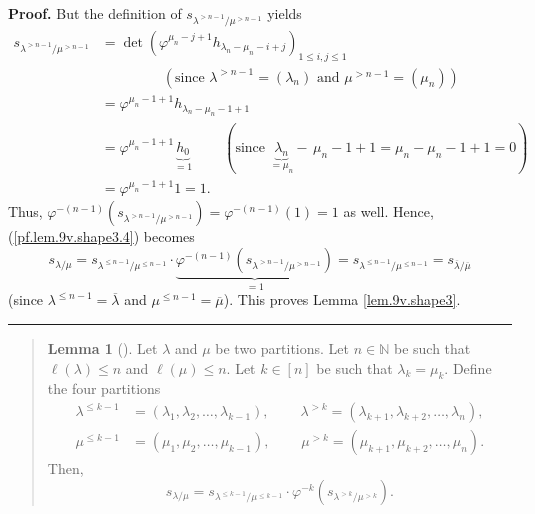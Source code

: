 \documentclass[numbers=enddot,12pt,final,onecolumn,notitlepage]{scrartcl}%
\newenvironment{statement}{\begin{quote}}{\end{quote}}
\theoremstyle{definition}
\newtheorem{lem}[theo]{Lemma}
\newenvironment{lemmain}[1][]
{\begin{statement}\begin{lem}[#1]}
{\end{lem}\end{statement}}
\newenvironment{proof}[1][Proof]{\noindent\textbf{#1.} }{\ \rule{0.5em}{0.5em}}
\newenvironment{lemmain}[1][Proof]{\noindent\textbf{#1.} }{\ \rule{0.5em}{0.5em}}
\begin{document}
\begin{enumerate}
\begin{proof}
But the definition of $s_{\lambda^{>n-1}/\mu^{>n-1}}$ yields%
\begin{align*}
s_{\lambda^{>n-1}/\mu^{>n-1}} &  =\det\left(  \varphi^{\mu_{n}-j+1}%
h_{\lambda_{n}-\mu_{n}-i+j}\right)  _{1\leq i,j\leq1}\\
&  \ \ \ \ \ \ \ \ \ \ \ \ \ \ \ \ \ \ \ \ \left(  \text{since }\lambda
^{>n-1}=\left(  \lambda_{n}\right)  \text{ and }\mu^{>n-1}=\left(  \mu
_{n}\right)  \right)  \\
&  =\varphi^{\mu_{n}-1+1}h_{\lambda_{n}-\mu_{n}-1+1}\\
&  =\varphi^{\mu_{n}-1+1}\underbrace{h_{0}}_{=1}\ \ \ \ \ \ \ \ \ \ \left(
\text{since }\underbrace{\lambda_{n}}_{=\mu_{n}}-\,\mu_{n}-1+1=\mu_{n}-\mu
_{n}-1+1=0\right)  \\
&  =\varphi^{\mu_{n}-1+1}1=1.
\end{align*}
Thus, $\varphi^{-\left(  n-1\right)  }\left(  s_{\lambda^{>n-1}/\mu^{>n-1}%
}\right)  =\varphi^{-\left(  n-1\right)  }\left(  1\right)  =1$ as well.
Hence, (\ref{pf.lem.9v.shape3.4}) becomes%
\[
s_{\lambda/\mu}=s_{\lambda^{\leq n-1}/\mu^{\leq n-1}}\cdot\underbrace{\varphi
^{-\left(  n-1\right)  }\left(  s_{\lambda^{>n-1}/\mu^{>n-1}}\right)  }%
_{=1}=s_{\lambda^{\leq n-1}/\mu^{\leq n-1}}=s_{\overline{\lambda}%
/\overline{\mu}}%
\]
(since $\lambda^{\leq n-1}=\overline{\lambda}$ and $\mu^{\leq n-1}%
=\overline{\mu}$). This proves Lemma \ref{lem.9v.shape3}.
\end{proof}

\begin{lemmain}
\label{lem.9v.shape4}Let $\lambda$ and $\mu$ be two partitions. Let
$n\in\mathbb{N}$ be such that $\ell\left(  \lambda\right)  \leq n$ and
$\ell\left(  \mu\right)  \leq n$. Let $k\in\left[  n\right]  $ be such that
$\lambda_{k}=\mu_{k}$. Define the four partitions%
\begin{align*}
\lambda^{\leq k-1}  &  =\left(  \lambda_{1},\lambda_{2},\ldots,\lambda
_{k-1}\right)  ,\ \ \ \ \ \ \ \ \ \ \lambda^{>k}=\left(  \lambda_{k+1}%
,\lambda_{k+2},\ldots,\lambda_{n}\right)  ,\\
\mu^{\leq k-1}  &  =\left(  \mu_{1},\mu_{2},\ldots,\mu_{k-1}\right)
,\ \ \ \ \ \ \ \ \ \ \mu^{>k}=\left(  \mu_{k+1},\mu_{k+2},\ldots,\mu
_{n}\right)  .
\end{align*}
Then,%
\[
s_{\lambda/\mu}=s_{\lambda^{\leq k-1}/\mu^{\leq k-1}}\cdot\varphi^{-k}\left(
s_{\lambda^{>k}/\mu^{>k}}\right)  .
\]

\end{lemmain}


\end{enumerate}
\end{document}
